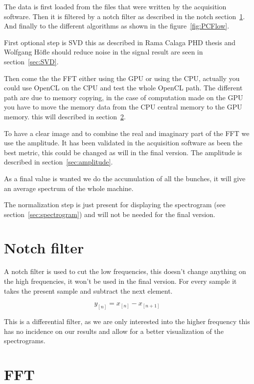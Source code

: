 	The data is first loaded from the files that were written by the acquisition software. Then it is filtered by a notch filter as described in the notch section~\ref{sec:notch}. And finally to the different algorithms as shown in the figure~\ref{fig:PCFlow}.

	First optional step is \gls{SVD} this as described in Rama Calaga PHD thesis\cite{calaga06} and Wolfgang H{\"o}f\/le\cite{HofleChamonix12} should reduce noise in the signal result are seen in section~\ref{sec:SVD}.

	Then come the the \gls{FFT} either using the \gls{GPU} or using the \gls{CPU}, actually you could use \gls{OpenCL} on the \gls{CPU} and test the whole \gls{OpenCL} path. The different path are due to memory copying, in the case of computation made on the \gls{GPU} you have to move the memory data from the \gls{CPU} central memory to the \gls{GPU} memory. this will described in section~\ref{sec:FFT}.

	To have a clear image and to combine the real and imaginary part of the \gls{FFT} we use the amplitude. It has been validated in the acquisition software as been the best metric, this could be changed as will in the final version. The amplitude is described in section~\ref{sec:amplitude}.

	As a final value is wanted we do the accumulation of all the bunches, it will give an average spectrum of the whole machine.

	The normalization step is just present for displaying the spectrogram (see section~\ref{sec:spectrogram}) and will not be needed for the final version.
 
\section{Notch filter}
\label{sec:notch}

A notch filter is used to cut the low frequencies, this doesn't change anything on the high frequencies, it won't be used in the final version. For every sample it takes the present sample and subtract the next element.

$$y_{[n]} = x_{[n]} - x_{[n + 1]}$$

This is a differential filter, as we are only interested into the higher frequency this has no incidence on our results and allow for a better visualization of the spectrograms.

\section{FFT}
\label{sec:FFT}

